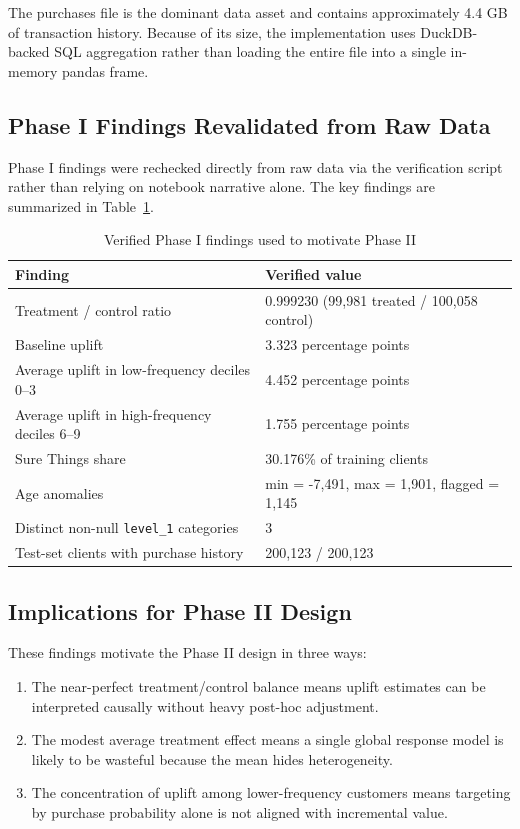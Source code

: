 \documentclass[11pt,a4paper]{article}
\begin{document}
The purchases file is the dominant data asset and contains approximately 4.4 GB of transaction history. Because of its size, the implementation uses DuckDB-backed SQL aggregation rather than loading the entire file into a single in-memory pandas frame.

\subsection{Phase I Findings Revalidated from Raw Data}
Phase I findings were rechecked directly from raw data via the verification script rather than relying on notebook narrative alone. The key findings are summarized in Table~\ref{tab:phase1}.

\begin{table}[H]
\centering
\caption{Verified Phase I findings used to motivate Phase II}
\label{tab:phase1}
\begin{tabular}{p{} p{}}
\toprule
\textbf{Finding} & \textbf{Verified value} \\
\midrule
Treatment / control ratio & 0.999230 (99{,}981 treated / 100{,}058 control) \\
Baseline uplift & 3.323 percentage points \\
Average uplift in low-frequency deciles 0--3 & 4.452 percentage points \\
Average uplift in high-frequency deciles 6--9 & 1.755 percentage points \\
Sure Things share & 30.176\% of training clients \\
Age anomalies & min = -7{,}491, max = 1{,}901, flagged = 1{,}145 \\
Distinct non-null \texttt{level\_1} categories & 3 \\
Test-set clients with purchase history & 200{,}123 / 200{,}123 \\
\bottomrule
\end{tabular}
\end{table}

\subsection{Implications for Phase II Design}
These findings motivate the Phase II design in three ways:
\begin{enumerate}
    \item The near-perfect treatment/control balance means uplift estimates can be interpreted causally without heavy post-hoc adjustment.
    \item The modest average treatment effect means a single global response model is likely to be wasteful because the mean hides heterogeneity.
    \item The concentration of uplift among lower-frequency customers means targeting by purchase probability alone is not aligned with incremental value.
\end{enumerate}
\end{document}
